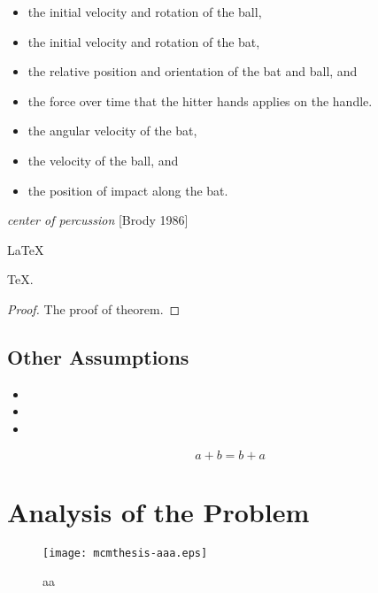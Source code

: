 \documentclass{mcmthesis}
\begin{document}
\begin{itemize}
\item the initial velocity and rotation of the ball,
\item the initial velocity and rotation of the bat,
\item the relative position and orientation of the bat and ball, and
\item the force over time that the hitter hands applies on the handle.
\end{itemize}
\begin{itemize}
\item the angular velocity of the bat,
\item the velocity of the ball, and
\item the position of impact along the bat.
\end{itemize}
\emph{center of percussion} [Brody 1986]

\begin{Theorem} \label{thm:latex}
\LaTeX
\end{Theorem}
\begin{Lemma} \label{thm:tex}
\TeX .
\end{Lemma}
\begin{proof}
The proof of theorem.
\end{proof}

\subsection{Other Assumptions}
\begin{itemize}
\item
\item
\item
\end{itemize}

\begin{center}
\end{center}

\begin{equation}
  a + b = b + a \label{eq:commutative}
\end {equation}


\section{Analysis of the Problem}
\begin{figure}[h]
\small
\centering
\texttt{[image: mcmthesis-aaa.eps]}
\caption{aa} \label{fig:aa}
\end{figure}
\end{document}
